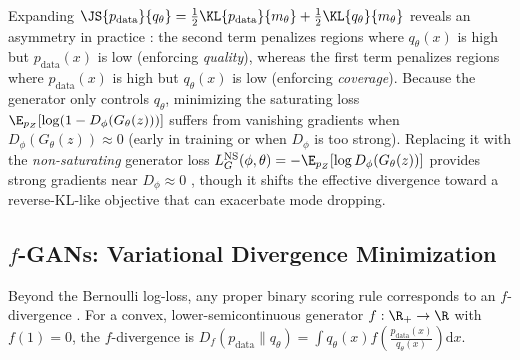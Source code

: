 \documentclass[../../../../master.tex]{subfiles}
\begin{document}
\begin{intuition}
Expanding $\JS{p_{\mathrm{data}}}{q_\theta} = \frac{1}{2}\KL{p_{\mathrm{data}}}{m_\theta} + \frac{1}{2}\KL{q_\theta}{m_\theta}$ reveals an asymmetry in practice : the second term penalizes regions where $q_\theta(x)$ is high but $p_{\mathrm{data}}(x)$ is low (enforcing \emph{quality}), whereas the first term penalizes regions where $p_{\mathrm{data}}(x)$ is high but $q_\theta(x)$ is low (enforcing \emph{coverage}). Because the generator only controls $q_\theta$, minimizing the saturating loss $\E_{p_Z}[\log(1 - D_\phi(G_\theta(z)))]$ suffers from vanishing gradients when $D_\phi(G_\theta(z)) \approx 0$ (early in training or when $D_\phi$ is too strong). Replacing it with the \emph{non-saturating} generator loss $L_G^{\mathrm{NS}}(\phi, \theta) = -\E_{p_Z}[\log D_\phi(G_\theta(z))]$ provides strong gradients near $D_\phi \approx 0$  , though it shifts the effective divergence toward a reverse-KL-like objective that can exacerbate mode dropping.
\end{intuition}

\subsection{$f$-GANs: Variational Divergence Minimization}

Beyond the Bernoulli log-loss, any proper binary scoring rule corresponds to an $f$-divergence . For a convex, lower-semicontinuous generator $f : \R_+ \to \R$ with $f(1) = 0$, the $f$-divergence is $D_f(p_{\mathrm{data}} \| q_\theta) = \int q_\theta(x) f\!\left(\frac{p_{\mathrm{data}}(x)}{q_\theta(x)}\right)\mathrm{d}x$.
\end{document}
